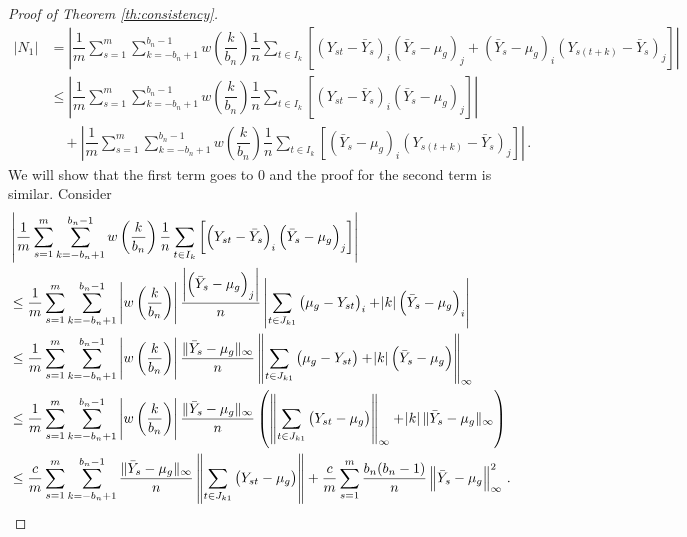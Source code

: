 \documentclass[12pt]{article}
\theoremstyle{remark}
\begin{document}
\begin{proof}[Proof of Theorem \ref{th:consistency}]
%
\begin{align*}
|N_1| & = \left|\dfrac{1}{m}\sum_{s=1}^{m}  \sum_{k=-b_n+1}^{b_n-1}  w\left(\dfrac{k}{b_n}\right)\dfrac{1}{n}  \sum_{t \in I_k}  \left[ \left(Y_{st} - \bar{Y}_s \right)_i  \left(\bar{Y}_s - \mu_g \right)_j + \left(\bar{Y}_s - \mu_g \right)_i  \left(Y_{s(t+k)} - \bar{Y}_s \right)_j\right] \right|\\
& \leq \left| \dfrac{1}{m}\sum_{s=1}^{m}\sum_{k=-b_n+1}^{b_n-1}w\left(\dfrac{k}{b_n}\right)\dfrac{1}{n}\sum_{t \in I_k}\left[ \left(Y_{st} - \bar{Y}_s \right)_i  \left(\bar{Y}_s - \mu_g \right)_j \right] \right| \\ 
& \quad + \left| \dfrac{1}{m}\sum_{s=1}^{m}\sum_{k=-b_n+1}^{b_n-1}w\left(\dfrac{k}{b_n}\right)\dfrac{1}{n}\sum_{t \in I_k}\left[ \left(\bar{Y}_s - \mu_g \right)_i  \left(Y_{s(t+k)} - \bar{Y}_s \right)_j\right] \right|\,.
\end{align*}
%
We will show that the first term goes to 0 and the proof for the second term is similar. Consider
\begin{align*}
    & \left| \dfrac{1}{m}\sum_{s=1}^{m}\sum_{k=-b_n+1}^{b_n-1}w\left(\dfrac{k}{b_n}\right)\dfrac{1}{n}\sum_{t \in I_k}\left[ \left(Y_{st} - \bar{Y}_s \right)_i  \left(\bar{Y}_s - \mu_g \right)_j \right] \right| \\
    & \leq \dfrac{1}{m}\sum_{s=1}^{m}\sum_{k=-b_n+1}^{b_n-1} \left| w\left(\dfrac{k}{b_n}\right) \right| \dfrac{ \left| \left(\bar{Y}_s - \mu_g \right)_j \right| }{n} \left| \sum_{t \in J_{k1}} \left(\mu_g - Y_{st} \right)_i  + \abs{k} \left(\bar{Y}_s - \mu_g \right)_i \right|\\
    & \leq \dfrac{1}{m}\sum_{s=1}^{m}\sum_{k=-b_n+1}^{b_n-1}  \left|w\left(\dfrac{k}{b_n}\right) \right|\dfrac{\|\bar{Y}_s - \mu_g\|_{\infty}}{n} \left\|\sum_{t \in J_{k1}} \left(\mu_g - Y_{st} \right) + \abs{k} \left(\bar{Y}_s - \mu_g \right)\right\|_{\infty}\\
    & \leq \dfrac{1}{m}\sum_{s=1}^{m}\sum_{k=-b_n+1}^{b_n-1} \left|w\left(\dfrac{k}{b_n}\right) \right|\dfrac{\|\bar{Y}_s - \mu_g\|_{\infty}}{n} \left(\left\|\sum_{t \in J_{k1}}  \left(Y_{st} - \mu_g \right)\right\|_{\infty} + \abs{k}\|\bar{Y}_s - \mu_g\|_{\infty} \right)\\
    & \leq \dfrac{c}{m}\sum_{s=1}^{m}\sum_{k=-b_n+1}^{b_n-1}\dfrac{\|\bar{Y}_s - \mu_g\|_{\infty}}{n} \left\|\sum_{t \in J_{k1}} \left(Y_{st} - \mu_g\right) \right\| + \dfrac{c}{m}\sum\limits_{s=1}^{m} \dfrac{b_n(b_n-1)}{n} \left \|\bar{Y}_s - \mu_g \right \|_{\infty}^2\,.
\end{align*}


\end{proof}
\end{document}
